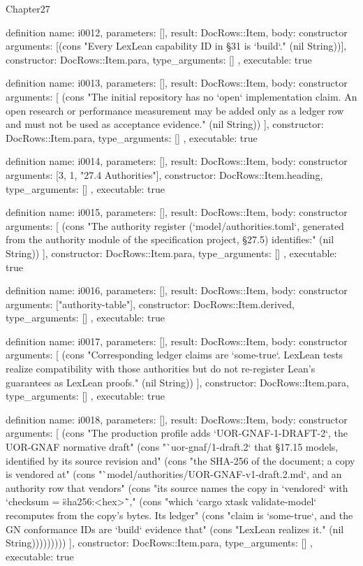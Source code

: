 \begin{lexlean}{Chapter27}
\begin{semanticmodule}
definition{
  name: i0012,
  parameters: [],
  result: DocRows::Item,
  body: constructor{
    arguments: [(cons "Every LexLean capability ID in §31 is `build`." (nil String))],
    constructor: DocRows::Item.para,
    type_arguments: []
  },
  executable: true
}

definition{
  name: i0013,
  parameters: [],
  result: DocRows::Item,
  body: constructor{
    arguments: [
      (cons "The initial repository has no `open` implementation claim. An open research or performance measurement may be added only as a ledger row and must not be used as acceptance evidence." (nil String))
    ],
    constructor: DocRows::Item.para,
    type_arguments: []
  },
  executable: true
}

definition{
  name: i0014,
  parameters: [],
  result: DocRows::Item,
  body: constructor{
    arguments: [3, 1, "27.4 Authorities"],
    constructor: DocRows::Item.heading,
    type_arguments: []
  },
  executable: true
}

definition{
  name: i0015,
  parameters: [],
  result: DocRows::Item,
  body: constructor{
    arguments: [
      (cons "The authority register (`model/authorities.toml`, generated from the authority module of the specification project, §27.5) identifies:" (nil String))
    ],
    constructor: DocRows::Item.para,
    type_arguments: []
  },
  executable: true
}

definition{
  name: i0016,
  parameters: [],
  result: DocRows::Item,
  body: constructor{
    arguments: ["authority-table"],
    constructor: DocRows::Item.derived,
    type_arguments: []
  },
  executable: true
}

definition{
  name: i0017,
  parameters: [],
  result: DocRows::Item,
  body: constructor{
    arguments: [
      (cons "Corresponding ledger claims are `some-true`. LexLean tests realize compatibility with those authorities but do not re-register Lean's guarantees as LexLean proofs." (nil String))
    ],
    constructor: DocRows::Item.para,
    type_arguments: []
  },
  executable: true
}

definition{
  name: i0018,
  parameters: [],
  result: DocRows::Item,
  body: constructor{
    arguments: [
      (cons "The production profile adds `UOR-GNAF-1-DRAFT-2`, the UOR-GNAF normative draft" (cons "`uor-gnaf/1-draft.2` that §17.15 models, identified by its source revision and" (cons "the SHA-256 of the document; a copy is vendored at" (cons "`model/authorities/UOR-GNAF-v1-draft.2.md`, and an authority row that vendors" (cons "its source names the copy in `vendored` with `checksum = \"sha256:<hex>\"`," (cons "which `cargo xtask validate-model` recomputes from the copy's bytes. Its ledger" (cons "claim is `some-true`, and the GN conformance IDs are `build` evidence that" (cons "LexLean realizes it." (nil String)))))))))
    ],
    constructor: DocRows::Item.para,
    type_arguments: []
  },
  executable: true
}


\end{semanticmodule}
\end{lexlean}
